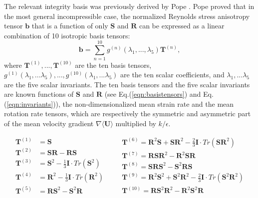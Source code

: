 \documentclass{article}
\numberwithin{equation}{section}
\begin{document}
The relevant integrity basis was previously derived by Pope \cite{pope1975more}. Pope proved that in the most general incompressible case, the normalized Reynolds stress anisotropy tensor $\mathbf{b}$ that is a function of only $\mathbf{S}$ and $\mathbf{R}$ can be expressed as a linear combination of 10 isotropic basis tensors:
\begin{equation}
    \mathbf{b} = \sum_{n=1}^{10}g^{(n)}\left(\lambda_1, ..., \lambda_5\right) \mathbf{T}^{(n)},
    \label{eqn:tbnn}
\end{equation}
where $\mathbf{T}^{(1)}, ..., \mathbf{T}^{(10)}$ are the ten basis tensors, $g^{(1)}(\lambda_1, ... \lambda_5), ..., g^{(10)}(\lambda_1, ... \lambda_5)$ are the ten scalar coefficients, and $\lambda_1, ... \lambda_5$ are the five scalar invariants. The ten basis tensors and the five scalar invariants are known functions of $\mathbf{S}$ and $\mathbf{R}$ (see Eq.(\ref{eqn:basistensors}) and Eq.(\ref{eqn:invariants})), the non-dimensionalized mean strain rate and the mean rotation rate tensors, which are respectively the symmetric and asymmetric part of the mean velocity gradient $\nabla \langle \mathbf{U} \rangle$ multiplied by $k/\epsilon$. 

\begin{equation}
    \begin{split}
        \mathbf{T}^{(1)} &= \mathbf{S}\\
        \mathbf{T}^{(2)} &= \mathbf{SR}-\mathbf{RS}\\
        \mathbf{T}^{(3)} &= \mathbf{S}^2-\tfrac{1}{3}\mathbf{I}\cdot Tr(\mathbf{S}^2)\\
        \mathbf{T}^{(4)} &= \mathbf{R}^2-\tfrac{1}{3}\mathbf{I}\cdot Tr(\mathbf{R}^2)\\
        \mathbf{T}^{(5)} &= \mathbf{RS}^2-\mathbf{S}^2\mathbf{R}\\
    \end{split}
    \quad
    \begin{split}
        &\mathbf{T}^{(6)} = \mathbf{R}^2\mathbf{S}+\mathbf{S}\mathbf{R}^2-\tfrac{2}{3}\mathbf{I}\cdot Tr(\mathbf{SR}^2)\\
        &\mathbf{T}^{(7)} = \mathbf{R}\mathbf{S}\mathbf{R}^2-\mathbf{R}^2\mathbf{S}\mathbf{R}\\
        &\mathbf{T}^{(8)} = \mathbf{S}\mathbf{R}\mathbf{S}^2-\mathbf{S}^2\mathbf{R}\mathbf{S}\\
        &\mathbf{T}^{(9)} = \mathbf{R}^2\mathbf{S}^2+\mathbf{S}^2\mathbf{R}^2-\tfrac{2}{3}\mathbf{I}\cdot Tr(\mathbf{S}^2\mathbf{R}^2)\\
        &\mathbf{T}^{(10)} = \mathbf{R}\mathbf{S}^2\mathbf{R}^2-\mathbf{R}^2\mathbf{S}^2\mathbf{R}\\
    \end{split}
    \label{eqn:basistensors}
\end{equation}
\end{document}
